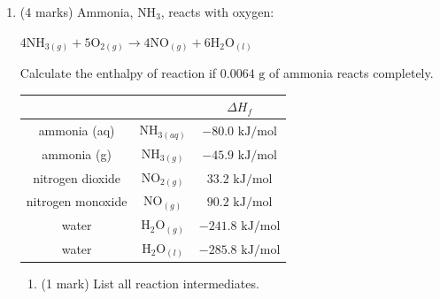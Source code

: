 \documentclass[11pt]{article}
\begin{document}
\begin{enumerate}[leftmargin=*, label=\arabic*., start=9]
    \item (4 marks) Ammonia, $\text{NH}_3$, reacts with oxygen:
    \begin{center}
        $4\text{NH}_{3(g)} + 5\text{O}_{2(g)} \rightarrow 4\text{NO}_{(g)} + 6\text{H}_2\text{O}_{(l)}$
    \end{center}
    Calculate the enthalpy of reaction if $0.0064\text{ g}$ of ammonia reacts completely.
    \begin{flushright}
        \begin{tabular}{|c|c|c|}
        \hline
        \multicolumn{2}{|c|}{} & $\Delta H_f$ \\ \hline
        ammonia (aq) & $\text{NH}_{3(aq)}$ & $-80.0\text{ kJ/mol}$ \\ \hline
        ammonia (g) & $\text{NH}_{3(g)}$ & $-45.9\text{ kJ/mol}$ \\ \hline
        nitrogen dioxide & $\text{NO}_{2(g)}$ & $33.2\text{ kJ/mol}$ \\ \hline
        nitrogen monoxide & $\text{NO}_{(g)}$ & $90.2\text{ kJ/mol}$ \\ \hline
        water & $\text{H}_2\text{O}_{(g)}$ & $-241.8\text{ kJ/mol}$ \\ \hline
        water & $\text{H}_2\text{O}_{(l)}$ & $-285.8\text{ kJ/mol}$ \\ \hline
        \end{tabular}
    \end{flushright}
    \vspace{7cm}
    \begin{enumerate}[label=\alph*.)]
        \item (1 mark) List all reaction intermediates.
    \end{enumerate}
\end{enumerate}

\vfill
\end{document}
